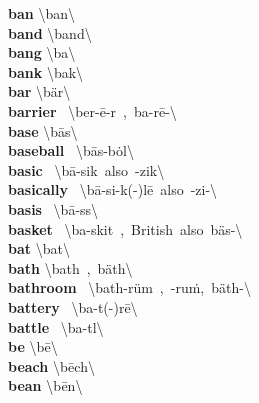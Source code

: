 \documentclass[10pt,a4paper]{article}
\begin{document}
\begin{multicols}{2}
\textbf{ ban }\quad \textbackslash \textprimstress ban\textbackslash \\
\textbf{ band }\quad \textbackslash \textprimstress band\textbackslash \\
\textbf{ bang }\quad \textbackslash \textprimstress ba\engma \textbackslash \\
\textbf{ bank }\quad \textbackslash \textprimstress ba\engma k\textbackslash \\
\textbf{ bar }\quad \textbackslash \textprimstress b\"{a}r\textbackslash \\
\textbf{ barrier }\quad \ \textbackslash \textprimstress ber-\={e}-\textschwa r\ ,\ \textprimstress ba-r\={e}-\textbackslash \\
\textbf{ base }\quad \textbackslash \textprimstress b\={a}s\textbackslash \\
\textbf{ baseball }\quad \ \textbackslash \textprimstress b\={a}s-\textsecstress b\.{o}l\textbackslash \\
\textbf{ basic }\quad \ \textbackslash \textprimstress b\={a}-sik\ also\ -zik\textbackslash \\
\textbf{ basically }\quad \ \textbackslash \textprimstress b\={a}-si-k(\textschwa -)l\={e}\ also\ -zi-\textbackslash \\
\textbf{ basis }\quad \ \textbackslash \textprimstress b\={a}-s\textschwa s\textbackslash \\
\textbf{ basket }\quad \ \textbackslash \textprimstress ba-skit\ ,\ British\ also\ \textprimstress b\"{a}s-\textbackslash \\
\textbf{ bat }\quad \textbackslash \textprimstress bat\textbackslash \\
\textbf{ bath }\quad \textbackslash \textprimstress bath\ ,\ \textprimstress b\"{a}th\textbackslash \\
\textbf{ bathroom }\quad \ \textbackslash \textprimstress bath-\textsecstress r\"{u}m\ ,\ -\textsecstress ru\. m,\ \textprimstress b\"{a}th-\textbackslash \\
\textbf{ battery }\quad \ \textbackslash \textprimstress ba-t(\textschwa -)r\={e}\textbackslash \\
\textbf{ battle }\quad \ \textbackslash \textprimstress ba-t\textsuperscript{\textreve}l\textbackslash \\
\textbf{ be }\quad \textbackslash \textprimstress b\={e}\textbackslash \\
\textbf{ beach }\quad \textbackslash \textprimstress b\={e}ch\textbackslash \\
\textbf{ bean }\quad \textbackslash \textprimstress b\={e}n\textbackslash \\

\end{multicols}
\end{document}
